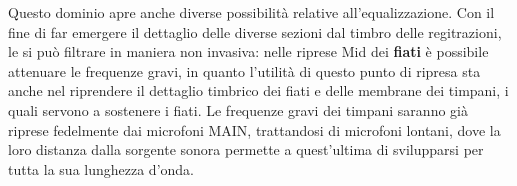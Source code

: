 	Questo dominio apre anche diverse possibilità relative all'equalizzazione.
	Con il fine di far emergere il dettaglio delle diverse sezioni dal timbro delle regitrazioni, le si può filtrare in maniera non invasiva: nelle riprese Mid dei \textbf{fiati} è possibile attenuare le frequenze gravi, in quanto l'utilità di questo punto di ripresa sta anche nel riprendere il dettaglio timbrico dei fiati e delle membrane dei timpani, i quali servono a sostenere i fiati. Le frequenze gravi dei timpani saranno già riprese fedelmente dai microfoni MAIN, trattandosi di microfoni lontani, dove la loro distanza dalla sorgente sonora permette a quest'ultima di svilupparsi per tutta la sua lunghezza d'onda.
	
	
	\vfill\null
	
	\newpage %
	
	
	\vfill\null
	
	\raggedright
	


